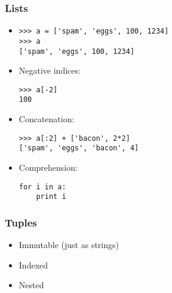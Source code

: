 \documentclass{beamer}
\begin{document}
\begin{frame}[fragile]
    \frametitle{Lists}
    \begin{itemize}

        \item<1-> \begin{verbatim}
>>> a = ['spam', 'eggs', 100, 1234]
>>> a
['spam', 'eggs', 100, 1234]
            \end{verbatim}

        \item<2-> Negative indices:
            \begin{verbatim}
>>> a[-2]
100
            \end{verbatim}

        \item<3-> Concatenation:
            \begin{verbatim}
>>> a[:2] + ['bacon', 2*2]
['spam', 'eggs', 'bacon', 4]
            \end{verbatim}

        \item<4-> Comprehension:
            \begin{verbatim}
for i in a:
    print i
            \end{verbatim}

    \end{itemize}
\end{frame}

\begin{frame}
    \frametitle{Tuples}
    \begin{itemize}
        \item<1-> Immutable (just as strings)
        \item<2-> Indexed
        \item<3-> Nested
    \end{itemize}
\end{frame}
\end{document}
